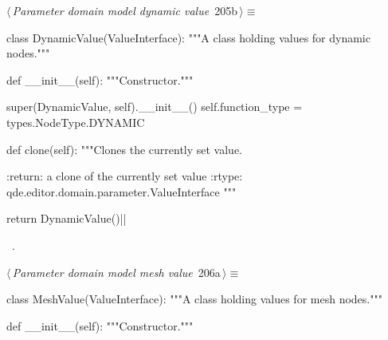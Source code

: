 \documentclass[%
    a4paper,    %
    justified,  %
    nobib,      %
    openany     %
]{tufte-book}
\makeatletter
\renewcommand{\label}[1]{\@tufte@label{##1}}%
\makeatother
\begin{document}
\begin{fullwidth}
\begin{flushleft}
\begin{minipage}{\linewidth}
\begin{list}{}{\setlength{\itemsep}{-\parsep}\setlength{\itemindent}{-\leftmargin}}
\item{}
\end{list}
\end{minipage}\vspace{4ex}
\end{flushleft}
\begin{flushleft} \small
\begin{minipage}{\linewidth}\label{scrap200}\raggedright\small
{} $\langle\,${\itshape Parameter domain model dynamic value}\nobreak\ {\footnotesize {205b}}$\,\rangle\equiv$
\vspace{-1ex}
\begin{pythoncode}
class DynamicValue(ValueInterface):
    """A class holding values for dynamic nodes."""

    def __init__(self):
        """Constructor."""

        super(DynamicValue, self).__init__()
        self.function_type = types.NodeType.DYNAMIC

    def clone(self):
        """Clones the currently set value.

        :return: a clone of the currently set value
        :rtype:  qde.editor.domain.parameter.ValueInterface
        """

        return DynamicValue()|\NWsep|
\end{pythoncode}
\vspace{1.5ex}
\footnotesize
\begin{list}{}{\setlength{\itemsep}{-\parsep}\setlength{\itemindent}{-\leftmargin}}
\item \NWtxtMacroRefIn\ .

\item{}
\end{list}
\end{minipage}\vspace{4ex}
\end{flushleft}
\begin{flushleft} \small
\begin{minipage}{\linewidth}\label{scrap201}\raggedright\small
{} $\langle\,${\itshape Parameter domain model mesh value}\nobreak\ {\footnotesize {206a}}$\,\rangle\equiv$
\vspace{-1ex}
\begin{pythoncode}
class MeshValue(ValueInterface):
    """A class holding values for mesh nodes."""

    def __init__(self):
        """Constructor."""


\end{pythoncode}
\end{minipage}
\end{flushleft}
\end{fullwidth}
\end{document}
